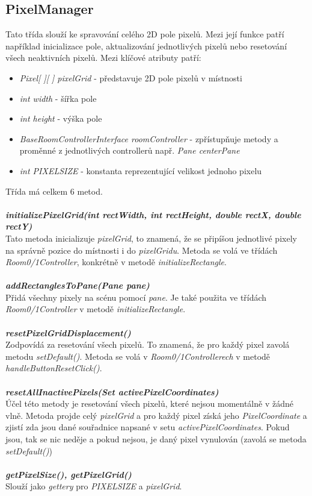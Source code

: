 \subsection{PixelManager}
Tato třída slouží ke spravování celého 2D pole pixelů. Mezi její funkce patří například inicializace pole, aktualizování jednotlivých pixelů nebo resetování všech neaktivních pixelů. Mezi klíčové atributy patří: 
\begin{itemize}
    \item \textit{Pixel[ ][ ] pixelGrid} - představuje 2D pole pixelů v místnosti
    \item \textit{int width} - šířka pole
    \item \textit{int height} - výška pole
    \item \textit{BaseRoomControllerInterface roomController} - zpřístupňuje metody a proměnné z jednotlivých controllerů např. \textit{Pane centerPane} 
    \item \textit{int PIXELSIZE} - konstanta reprezentující velikost jednoho pixelu
\end{itemize}
Třída má celkem 6 metod.\\
\\
\textbf{\textit{initializePixelGrid(int rectWidth, int rectHeight, double rectX, double rectY)}}\\
Tato metoda inicializuje \textit{pixelGrid}, to znamená, že se připíšou jednotlivé pixely na správně pozice do místnosti i do \textit{pixelGridu}. Metoda se volá ve třídách \textit{Room0/1Controller}, konkrétně v metodě \textit{initializeRectangle}.\\
\\
\textbf{\textit{addRectanglesToPane(Pane pane)}}\\
Přidá všechny pixely na scénu pomocí \textit{pane}. Je také použita ve třídách \textit{Room0/1Controller} v metodě \textit{initializeRectangle}.\\
\\
\textbf{\textit{resetPixelGridDisplacement()}}\\
Zodpovídá za resetování všech pixelů. To znamená, že pro každý pixel zavolá metodu \textit{setDefault()}. Metoda se volá v \textit{Room0/1Controllerech} v metodě \textit{handleButtonResetClick()}.\\
\\
\textbf{\textit{resetAllInactivePixels(Set activePixelCoordinates)}}\\
Účel této metody je resetování všech pixelů, které nejsou momentálně v žádné vlně. Metoda projde celý \textit{pixelGrid} a pro každý pixel získá jeho \textit{PixelCoordinate} a zjistí zda jsou dané souřadnice napsané v setu \textit{activePixelCoordinates}. Pokud jsou, tak se nic neděje a pokud nejsou, je daný  pixel vynulován (zavolá se metoda \textit{setDefault()})\\
\\
\textbf{\textit{getPixelSize(), getPixelGrid()}}\\
Slouží jako \textit{gettery} pro \textit{PIXELSIZE} a \textit{pixelGrid}.
